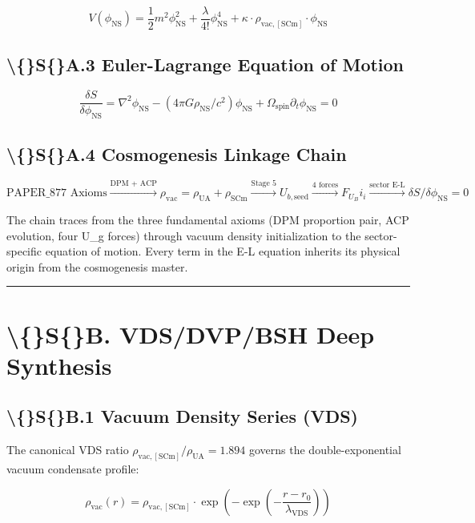 \documentclass[11pt]{article}
\begin{document}
$$V(\phi_{\mathrm{NS}}) = \frac{1}{2} m^2 \phi_{\mathrm{NS}}^2 + \frac{\lambda}{4!} \phi_{\mathrm{NS}}^4 + \kappa \cdot \rho_{\mathrm{vac,[SCm]}} \cdot \phi_{\mathrm{NS}}$$

\subsection*{\textbackslash\{\}S\{\}A.3 Euler-Lagrange Equation of Motion}

$$\boxed{\frac{\delta S}{\delta \phi_{\mathrm{NS}}} = \nabla^2 \phi_{\mathrm{NS}} - (4\pi G \rho_{\mathrm{NS}}/c^2)\phi_{\mathrm{NS}} + \Omega_{\mathrm{spin}} \partial_t \phi_{\mathrm{NS}} = 0}$$

\subsection*{\textbackslash\{\}S\{\}A.4 Cosmogenesis Linkage Chain}

$$\text{PAPER\_877 Axioms} \xrightarrow{\text{DPM + ACP}} \rho_{\mathrm{vac}} = \rho_{\mathrm{UA}} + \rho_{\mathrm{SCm}} \xrightarrow{\text{Stage 5}} U_{b,\mathrm{seed}} \xrightarrow{\text{4 forces}} F_U_Bi_i \xrightarrow{\text{sector E-L}} \delta S/\delta \phi_{\mathrm{NS}} = 0$$

The chain traces from the three fundamental axioms (DPM proportion pair, ACP evolution, four U\_g forces) through vacuum density initialization to the sector-specific equation of motion. Every term in the E-L equation inherits its physical origin from the cosmogenesis master.

\noindent\rule{\textwidth}{0.4pt}

\section*{\textbackslash\{\}S\{\}B. VDS/DVP/BSH Deep Synthesis}

\subsection*{\textbackslash\{\}S\{\}B.1 Vacuum Density Series (VDS)}

The canonical VDS ratio $\rho_{\mathrm{vac,[SCm]}} / \rho_{\mathrm{UA}} = 1.894$ governs the double-exponential vacuum condensate profile:

$$\rho_{\mathrm{vac}}(r) = \rho_{\mathrm{vac,[SCm]}} \cdot \exp\!\left(-\exp\!\left(-\frac{r - r_0}{\lambda_{\mathrm{VDS}}}\right)\right)$$
\end{document}
